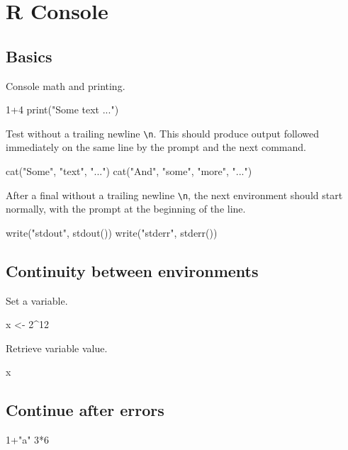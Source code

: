 \documentclass[11pt]{article}
\begin{document}
\section*{R Console}


\subsection*{Basics}

Console math and printing.

\begin{Rconsole}
1+4
print("Some text ...")
\end{Rconsole}

Test  without a trailing newline \verb|\n|.  This should produce output followed immediately on the same line by the prompt and the next command.
\begin{Rconsole}
cat("Some", "text", "...")
cat("And", "some", "more", "...")
\end{Rconsole}

After a final  without a trailing newline \verb|\n|, the next environment should start normally, with the prompt at the beginning of the line.

\begin{Rconsole}
write("stdout", stdout())
write("stderr", stderr())
\end{Rconsole}


\subsection*{Continuity between environments}

Set a variable.
\begin{Rconsole}
x <- 2^12
\end{Rconsole}

Retrieve variable value.
\begin{Rconsole}
x
\end{Rconsole}


\subsection*{Continue after errors}

\begin{Rconsole}
1+"a"
3*6
\end{Rconsole}
\end{document}
